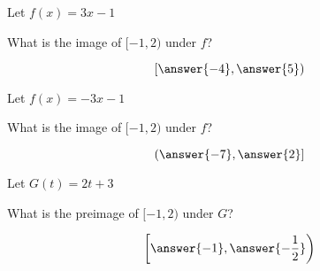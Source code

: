 \documentclass{ximera}
\author{Lee Wayand}
\begin{document}
\begin{exercise}








\begin{question}



Let $f(x) = 3x - 1$

What is the image of $[-1, 2)$ under $f$?

\[
\left[ \answer{-4}, \answer{5} \right)
\]



\end{question}







\begin{question}



Let $f(x) = -3x - 1$

What is the image of $[-1, 2)$ under $f$?

\[
\left( \answer{-7}, \answer{2} \right]
\]



\end{question}











\begin{question}



Let $G(t) = 2t + 3$

What is the preimage of $[-1, 2)$ under $G$?

\[
\left[ \answer{-1}, \answer{-\frac{1}{2}} \right)
\]



\end{question}










\end{exercise}
\end{document}
